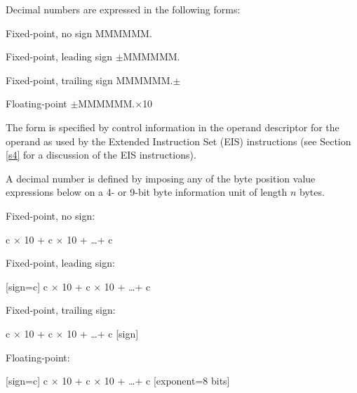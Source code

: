 
Decimal numbers are expressed in the following forms:


Fixed-point, no sign MMMMMM.

Fixed-point, leading sign $\pm$MMMMMM.

Fixed-point, trailing sign MMMMMM.$\pm$

Floating-point $\pm$MMMMMM.$\times$10

The form is specified by control information in the operand descriptor for the
operand as used by the Extended Instruction Set (EIS) instructions (see Section
\ref{s4} for a discussion of the EIS instructions).

A decimal number is defined by imposing any of the byte position value
expressions below on a 4- or 9-bit byte information unit of length $n$ bytes.


Fixed-point, no sign:

\hspace{1em}c $\times$ 10 + c $\times$ 10 + \ldots + c


Fixed-point, leading sign:

\hspace{1em}[sign=c] c $\times$ 10 + c $\times$ 10 + \ldots + c

Fixed-point, trailing sign:

\hspace{1em}c $\times$ 10 + c $\times$ 10 + \ldots + c [sign]

Floating-point:

\hspace{1em}[sign=c] c $\times$ 10 + c $\times$ 10 + \ldots + c [exponent=8 bits]

